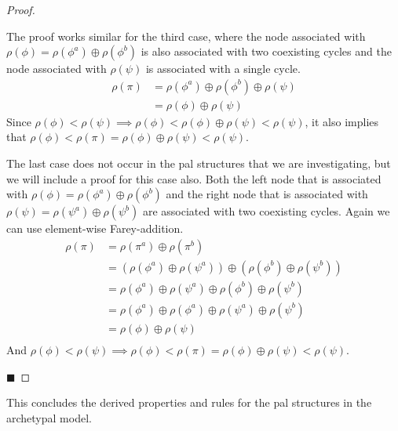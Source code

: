 \begin{proof}
\begin{itemize}
			The proof works similar for the third case, where the node associated with $\rho(\phi) = \rho(\phi^a) \oplus \rho(\phi^b)$ is also associated with two coexisting cycles and the node associated with $\rho(\psi)$ is associated with a single cycle.
			\begin{align*}
				\rho(\pi) & = \rho(\phi^a) \oplus \rho(\phi^b) \oplus \rho(\psi) \\
				          & = \rho(\phi) \oplus \rho(\psi)
			\end{align*}
			Since $\rho(\phi) < \rho(\psi) \implies \rho(\phi) < \rho(\phi) \oplus \rho(\psi) < \rho(\psi)$, it also implies that $ \rho(\phi) < \rho(\pi) = \rho(\phi) \oplus \rho(\psi) < \rho(\psi)$.

			The last case does not occur in the \gls{pal} structures that we are investigating, but we will include a proof for this case also.
			Both the left node that is associated with $\rho(\phi) = \rho(\phi^a) \oplus \rho(\phi^b)$ and the right node that is associated with $\rho(\psi) = \rho(\psi^a) \oplus \rho(\psi^b)$ are associated with two coexisting cycles.
			Again we can use element-wise Farey-addition.
			\begin{align*}
				\rho(\pi) & = \rho(\pi^a) \oplus \rho(\pi^b)                                                                     \\
				          & = \left(\rho(\phi^a) \oplus \rho(\psi^a)\right) \oplus \left(\rho(\phi^b) \oplus \rho(\psi^b)\right) \\
				          & = \rho(\phi^a) \oplus \rho(\psi^a) \oplus \rho(\phi^b) \oplus \rho(\psi^b)                           \\
				          & = \rho(\phi^a) \oplus \rho(\phi^a) \oplus \rho(\psi^a) \oplus \rho(\psi^b)                           \\
				          & = \rho(\phi) \oplus \rho(\psi)                                                                       \\
			\end{align*}
			And $\rho(\phi) < \rho(\psi) \implies \rho(\phi) < \rho(\pi) = \rho(\phi) \oplus \rho(\psi) < \rho(\psi)$.
	\end{itemize}
	\hfill $\blacksquare$
\end{proof}

This concludes the derived properties and rules for the \gls{pal} structures in the archetypal model.
